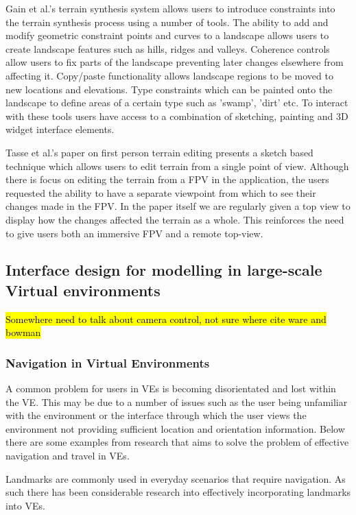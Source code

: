 \documentclass{sig-alternate-05-2015}
\begin{document}
 Gain et al.'s terrain synthesis system allows users to introduce constraints into the terrain synthesis process using a number of tools\cite{Gain2015}. The ability to add and modify geometric constraint points and curves to a landscape allows users to create landscape features such as hills, ridges and valleys.  Coherence controls allow users to fix parts of the landscape preventing later changes elsewhere from affecting it. Copy/paste functionality allows landscape regions to be moved to new locations and elevations. Type constraints which can be painted onto the landscape to define areas of a certain type such as 'swamp', 'dirt' etc. To interact with these tools users have access to a combination of sketching, painting and 3D widget interface elements. %

Tasse et al.'s paper on first person terrain editing presents a sketch based technique which allows users to  edit terrain from a single point of view\cite{Tasse2014}. Although there is focus on editing the terrain from a FPV in the application, the users requested the ability to have a separate viewpoint from which to see their changes made in the FPV. In the paper itself we are regularly given a top view to display how the changes affected the terrain as a whole. This reinforces the need to give users both an immersive FPV and a remote top-view.
\subsection{Interface design for modelling in large-scale Virtual environments}
\hl{Somewhere need to talk about camera control, not sure where cite ware and bowman}
\subsubsection{Navigation in Virtual Environments}
A common problem for users in VEs is becoming disorientated and lost within the VE\cite{Darken1993}. This may be due to a number of issues such as the user being unfamiliar with the environment or the interface through which the user views the environment not providing sufficient location and orientation information. Below there are some examples from research that aims to solve the problem of effective navigation and travel in VEs.

Landmarks are commonly used in everyday scenarios that require navigation. As such there has been considerable research into effectively incorporating landmarks into VEs.
\end{document}
